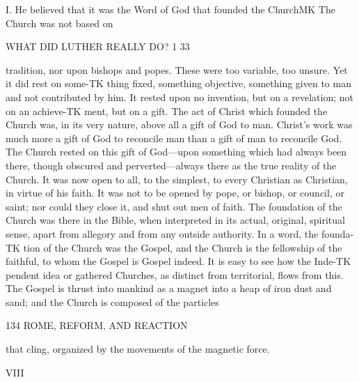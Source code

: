 \documentclass[12pt,a5paper,oneside]{book}
\begin{document}
I. He believed that it was the Word of God that 
founded the ChurchMK The Church was not based on 



WHAT DID LUTHER REALLY DO? 1 33 

tradition, nor upon bishops and popes. These were 
too variable, too unsure. Yet it did rest on some-TK
thing fixed, something objective, something given to 
man and not contributed by him. It rested upon no 
invention, but on a revelation; not on an achieve-TK
ment, but on a gift. The act of Christ which 
founded the Church was, in its very nature, above all 
a gift of God to man. Christ's work was much more 
a gift of God to reconcile man than a gift of man to 
reconcile God. The Church rested on this gift of 
God---upon something which had always been there, 
though obscured and perverted---always there as the 
true reality of the Church. It was now open to all, to 
the simplest, to every Christian as Christian, in virtue 
of his faith. It was not to be opened by pope, or 
bishop, or council, or saint; nor could they close it, 
and shut out men of faith. The foundation of the 
Church was there in the Bible, when interpreted in its 
actual, original, spiritual sense, apart from allegory and 
from any outside authority. In a word, the founda-TK
tion of the Church was the Gospel, and the Church 
is the fellowship of the faithful, to whom the Gospel 
is Gospel indeed. It is easy to see how the Inde-TK
pendent idea or gathered Churches, as distinct from 
territorial, flows from this. The Gospel is thrust into 
mankind as a magnet into a heap of iron dust and 
sand; and the Church is composed of the particles 



134 ROME, REFORM, AND REACTION 

that cling, organized by the movements of the magnetic 
force. 

VIII 
\end{document}
